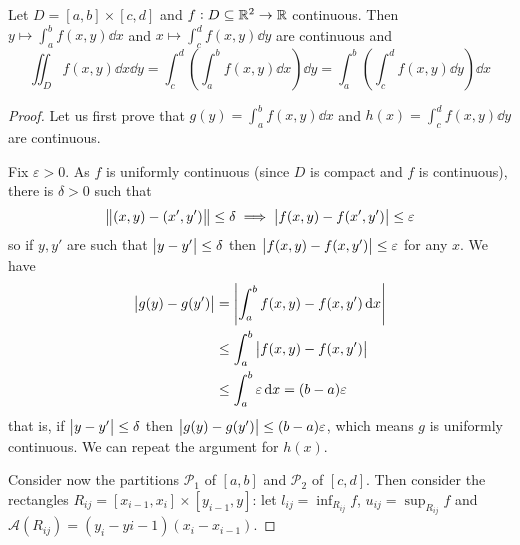 \documentclass[12pt]{extarticle}
\begin{document}
\begin{theorem}
    Let $D = [a, b] \times [c, d]$ and $f: D \subseteq \mathbb{R}^2 \to \mathbb{R}$ continuous.
    Then $y \mapsto \int_a^b f(x, y) \dd{x}$ and $x \mapsto \int_c^d f(x, y) \dd{y}$ are continuous and
    \begin{equation}
        \iint_D f(x, y) \dd{x}\dd{y} = \int_c^d \left(\int_a^b f(x,y) \dd{x}\right) \dd{y} = \int_a^b \left(\int_c^d f(x,y) \dd{y}\right) \dd{x}
    \end{equation}
\end{theorem}
\begin{proof}
    Let us first prove that $g(y) = \int_a^b f(x, y) \dd{x}$ and $h(x) = \int_c^d f(x, y) \dd{y}$ are continuous.

    Fix $\varepsilon > 0$. As $f$ is uniformly continuous (since $D$ is compact and $f$ is continuous), there is $\delta > 0$ such that
    \begin{equation}
        \norm{(x,y)- (x',y')} \leq \delta \implies \abs{f(x, y) - f(x', y')} \leq \varepsilon
    \end{equation}
    so if $y, y'$ are such that $\abs{y-y'} \leq \delta$ then $\abs{f(x,y) - f(x,y')} \leq \varepsilon$ for any $x$.
    We have
    \begin{align}
        \abs{g(y) - g(y')} & = \abs{\int_a^b f(x,y) - f(x,y') \dd{x}}             \\
                           & \leq \int_a^b \abs{f(x, y) - f(x, y')}               \\
                           & \leq \int_a^b \varepsilon \dd{x} = (b-a) \varepsilon
    \end{align}
    that is, if $\abs{y-y'} \leq \delta$ then $\abs{g(y) - g(y')} \leq (b-a)\varepsilon$, which means $g$ is uniformly continuous.
    We can repeat the argument for $h(x)$.

    Consider now the partitions $\mathcal P_1$ of $[a, b]$ and $\mathcal P_2$ of $[c, d]$.
    Then consider the rectangles $R_{ij} = [x_{i-1}, x_i] \times [y_{i-1}, y]$: let $l_{ij} = \inf_{R_{ij}} f$, $u_{ij} = \sup_{R_{ij}} f$ and $\mathscr A(R_{ij}) = (y_i -y{i-1}) (x_i - x_{i-1})$.


\end{proof}
\end{document}
